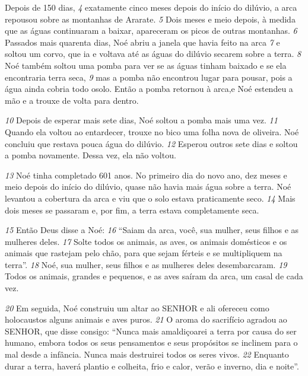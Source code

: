 \bigskip
Depois de 150 dias, 
\textit{\tiny 4}
 exatamente cinco meses depois do início do dilúvio, a arca repousou sobre as montanhas de Ararate. 
\textit{\tiny 5}
 Dois meses e meio depois, à medida que as águas continuaram a baixar, apareceram os picos de outras montanhas. 
\textit{\tiny 6}
 Passados mais quarenta dias, Noé abriu a janela que havia feito na arca 
\textit{\tiny 7}
 e soltou um corvo, que ia e voltava até as águas do dilúvio secarem sobre a terra. 
\textit{\tiny 8}
 Noé também soltou uma pomba para ver se as águas tinham baixado e se ela encontraria terra seca, 
\textit{\tiny 9}
 mas a pomba não encontrou lugar para pousar, pois a água ainda cobria todo osolo. Então a pomba retornou à arca,e Noé estendeu a mão e a trouxe de volta para dentro.


\bigskip
\textit{\tiny 10}
 Depois de esperar mais sete dias, Noé soltou a pomba mais uma vez. 
\textit{\tiny 11}
 Quando ela voltou ao entardecer, trouxe no bico uma folha nova de oliveira. Noé concluiu que restava pouca água do dilúvio. 
\textit{\tiny 12}
 Esperou outros sete dias e soltou a pomba novamente. Dessa vez, ela não voltou.


\bigskip
\textit{\tiny 13}
 Noé tinha completado 601 anos. No primeiro dia do novo ano, dez meses e meio depois do início do dilúvio, quase não havia mais água sobre a terra. Noé levantou a cobertura da arca e viu que o solo estava praticamente seco. 
\textit{\tiny 14}
 Mais dois meses se passaram e, por fim, a terra estava completamente seca.


\bigskip
\textit{\tiny 15}
 Então Deus disse a Noé: 
\textit{\tiny 16}
 “Saiam da arca, você, sua mulher, seus filhos e as mulheres deles. 
\textit{\tiny 17}
 Solte todos os animais, as aves, os animais domésticos e os animais que rastejam pelo chão, para que sejam férteis e se multipliquem na terra”. 
\textit{\tiny 18}
 Noé, sua mulher, seus filhos e as mulheres deles desembarcaram. 
\textit{\tiny 19}
 Todos os animais, grandes e pequenos, e as aves saíram da arca, um casal de cada vez.


\bigskip
\textit{\tiny 20}
 Em seguida, Noé construiu um altar ao SENHOR e ali ofereceu como holocaustos alguns animais e aves puros. 
\textit{\tiny 21}
 O aroma do sacrifício agradou ao SENHOR, que disse consigo: “Nunca mais amaldiçoarei a terra por causa do ser humano, embora todos os seus pensamentos e seus propósitos se inclinem para o mal desde a infância. Nunca mais destruirei todos os seres vivos. 
\textit{\tiny 22}
 Enquanto durar a terra, haverá plantio e colheita, frio e calor, verão e inverno, dia e noite”.

